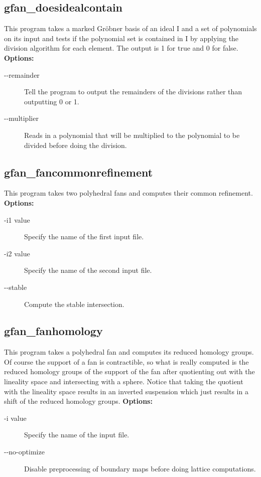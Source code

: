 {{{{\subsection{gfan\_doesidealcontain}\label{applist:_doesidealcontain}
This program takes a marked Gr\"obner basis of an ideal I and a set of polynomials on its input and tests if the polynomial set is contained in I by applying the division algorithm for each element. The output is 1 for true and 0 for false.
\newline
{\bf Options:}
\begin{description}
\item[-\hspace{0.013cm}-remainder]Tell the program to output the remainders of the divisions rather than outputting 0 or 1.\item[-\hspace{0.013cm}-multiplier]Reads in a polynomial that will be multiplied to the polynomial to be divided before doing the division.\end{description}


{\subsection{gfan\_fancommonrefinement}\label{applist:_fancommonrefinement}
This program takes two polyhedral fans and computes their common refinement.
\newline
{\bf Options:}
\begin{description}
\item[-i1 value]Specify the name of the first input file.\item[-i2 value]Specify the name of the second input file.\item[-\hspace{0.013cm}-stable]Compute the stable intersection.\end{description}


{\subsection{gfan\_fanhomology}\label{applist:_fanhomology}
This program takes a polyhedral fan and computes its reduced homology groups. Of course the support of a fan is contractible, so what is really computed is the reduced homology groups of the support of the fan after quotienting out with the lineality space and intersecting with a sphere. Notice that taking the quotient with the lineality space results in an inverted suspension which just results in a shift of the reduced homology groups.
\newline
{\bf Options:}
\begin{description}
\item[-i value]Specify the name of the input file.\item[-\hspace{0.013cm}-no-optimize]Disable preprocessing of boundary maps before doing lattice computations.\end{description}


}}}}}}
